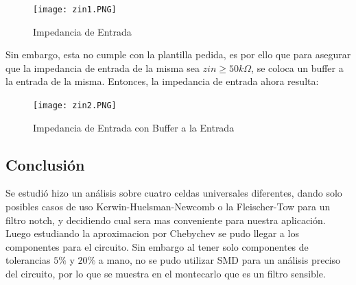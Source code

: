 \begin{figure}[H]
    \centering
    \texttt{[image: zin1.PNG]}
    \caption{Impedancia de Entrada}
    \label{ej4zin1}
\end{figure}

Sin embargo, esta no cumple con la plantilla pedida, es por ello que para asegurar que la impedancia de entrada de la misma sea $zin \geq 50k\Omega$, se coloca un buffer a la entrada de la misma. Entonces, la impedancia de entrada ahora resulta:

\begin{figure}[H]
    \centering
    \texttt{[image: zin2.PNG]}
    \caption{Impedancia de Entrada con Buffer a la Entrada}
    \label{ej4zin2}
\end{figure}


\subsection{Conclusión}

Se estudió hizo un análisis sobre cuatro celdas universales diferentes, dando solo posibles casos de uso Kerwin-Huelsman-Newcomb o la Fleischer-Tow para un filtro notch, y decidiendo cual sera mas conveniente para nuestra aplicación. Luego estudiando la aproximacion por Chebychev se pudo llegar a los componentes para el circuito. Sin embargo al tener solo componentes de tolerancias $5\%$ y $20\%$ a mano, no se pudo utilizar SMD para un análisis preciso del circuito, por lo que se muestra en el montecarlo que es un filtro sensible. 

